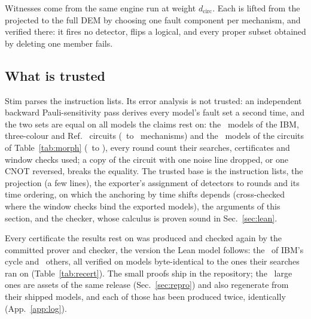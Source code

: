 \documentclass[aps,pra,twocolumn,superscriptaddress,nofootinbib,longbibliography,floatfix]{revtex4-2}
\newcommand{\dc}{d_{\mathrm{circ}}}
\begin{document}
Witnesses come from the same engine run at weight $\dc$. Each is lifted from the projected to the full DEM by choosing one fault component per mechanism, and verified there: it fires no detector, flips a logical, and every proper subset obtained by deleting one member fails.

\subsection{What is trusted}
\label{sec:trusted}

Stim parses the instruction lists. Its error analysis is not trusted: an independent backward Pauli-sensitivity pass derives every model's fault set a second time, and the two sets are equal on all models the claims rest on: the \DemModels\ models of the IBM, three-colour and Ref.~\cite{shaw2024lowering} circuits (\DemMechLo\ to \DemMechHi\ mechanisms) and the \DemTwentySixModels\ models of the circuits of Table~\ref{tab:morph} (\DemTwentySixMechLo\ to \DemTwentySixMechHi), every round count their searches, certificates and window checks used; a copy of the circuit with one noise line dropped, or one CNOT reversed, breaks the equality. The trusted base is the instruction lists, the projection (a few lines), the exporter's assignment of detectors to rounds and its time ordering, on which the anchoring by time shifts depends (cross-checked where the window checks bind the exported models), the arguments of this section, and the checker, whose calculus is proven sound in Sec.~\ref{sec:lean}.

Every certificate the results rest on was produced and checked again by the committed prover and checker, the version the Lean model follows: the \IbmRecertCerts\ of IBM's cycle and \RecertCells\ others, all verified on models byte-identical to the ones their searches ran on (Table~\ref{tab:recert}). The small proofs ship in the repository; the \RecertRegen\ large ones are assets of the same release (Sec.~\ref{sec:repro}) and also regenerate from their shipped models, and each of those has been produced twice, identically (App.~\ref{app:log}).

\begin{table}[tbp]
\caption{The re-certification, per proof set. \emph{Shipped}: in the repository; the other proofs of a set are release assets (Sec.~\ref{sec:repro}). \emph{Regen.}: regenerated by the committed prover; \emph{$=$ record}: byte-identical to the originally recorded proof; \emph{old prover}: recorded proofs that the prover of development commit \RecertOldCommits\ reproduces bit for bit (App.~\ref{app:log}); \emph{2nd run}: regenerated again at another thread count, identically. Three-colour time-shift proofs equal to their records are (a), the others (b). Every proof was verified by the committed checker on a model byte-identical to the one its search ran on. Every count is re-derived from the records by \texttt{make\_numbers\_distance.py}.}
\label{tab:recert}
\small\setlength{\tabcolsep}{8pt}

\end{table}
\end{document}
